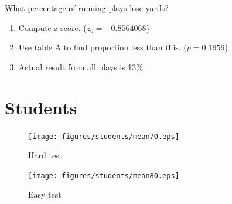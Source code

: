 \documentclass{exam}
\begin{document}
  What percentage of running plays lose yards?
  \begin{enumerate}
    \item Compute z-score.  ($z_0 = -0.8564068$)

    \item Use table A to find proportion less than this. ($p = 0.1959$)

    \item Actual result from all plays is 13\% 

  \end{enumerate}

  \section{Students}

  \begin{figure}[H]
    \centering
    \texttt{[image: figures/students/mean70.eps]}
    \caption{Hard test}
  \end{figure}

  \begin{figure}[H]
    \centering
    \texttt{[image: figures/students/mean80.eps]}
    \caption{Easy test}
  \end{figure}
\end{document}
